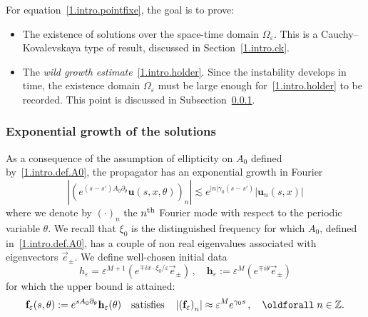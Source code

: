 \documentclass[10pt]{amsart}
\theoremstyle{definition}
\theoremstyle{plain}
\newcommand*\e{\varepsilon}
\newcommand*\Z{{\mathbb Z}}
\newcommand{\dptl}{\partial}%
\newcommand*\g{\gamma}
\newcommand{\ubf}{{\mathbf u}}
\newcommand*\f{{\mathbf f}}
\newcommand*\h{{\mathbf h}}
\renewcommand*{\forall}{\mathrel{\oldforall}}
\begin{document}
For equation~\eqref{1.intro.pointfixe}, the goal is to prove:
\begin{itemize}
\item The existence of solutions over the space-time domain $\Omega_{\e}$. This is a Cauchy--Kovalevskaya type of result, discussed in Section~\ref{1.intro.ck}.
\item The \emph{wild growth estimate}~\eqref{1.intro.holder}. Since the instability develops in time, the existence domain $\Omega_{\e}$ must be large enough for~\eqref{1.intro.holder} to be recorded. This point is discussed in Subsection~\ref{1.intro.growth.solutions}.
\end{itemize}


\subsubsection{Exponential growth of the solutions}\label{1.intro.growth.solutions}

As a consequence of the assumption of ellipticity on $A_0$ defined by~\eqref{1.intro.def.A0}, the propagator has an exponential growth in Fourier
\begin{equation}
\label{1.intro.growth.fourier}
\left|\left(e^{(s-s')A_0\dptl_{\theta}} \ubf(s,x,\theta)\right)_n\right| \lesssim e^{|n|\g_0(s-s')} | \ubf_n(s,x)|
\end{equation}
where we denote by $(\cdot)_n$ the $n^{\rm th}$ Fourier mode with respect to the periodic variable $\theta$. We recall that $\xi_0$ is the distinguished frequency for which $A_0$, defined in~\eqref{1.intro.def.A0}, has a couple of non real eigenvalues associated with eigenvectors $\vec{e}_{\pm}$. We define well-chosen initial data
\begin{equation}\label{1.intro.initial}
h_{\e} = \e^{M+1} \left(e^{\mp i x\cdot\xi_0/\e} \vec{e}_{\pm} \right)\,, \quad \h_{\e} := \e^{M}\left(e^{ \mp i \theta}\vec{e}_{\pm}\right)
\end{equation}
for which the upper bound is attained:
\begin{equation}\label{1.intro.fepsilon}
\f_{\e}(s,\theta) := e^{sA_0\dptl_{\theta}}\h_{\e}(\theta) \quad \text{satisfies} \quad \left|\left(\f_{\e}\right)_n\right| \approx \e^{M}e^{\g_0s}\,, \quad \forall n\in\Z.
\end{equation}
\end{document}

